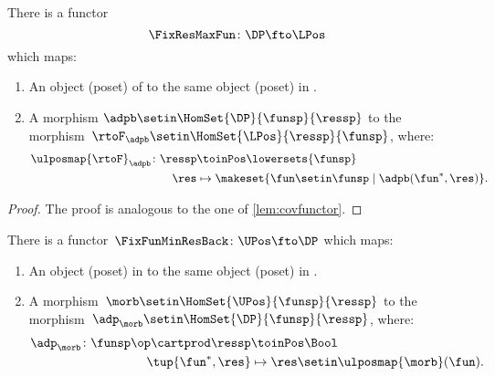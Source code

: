 \begin{lemma}
    \label{lem:confunctor}
    There is a functor
    \begin{equation}
        \FixResMaxFun\colon \DP \fto \LPos
    \end{equation}
    which maps:
    \begin{enumerate}
        \item An object (poset) of \DP to the same object (poset) in \LPos.
        \item A morphism $\adpb \setin \HomSet{\DP}{\funsp}{\ressp}$ to the morphism~$\rtoF_\adpb\setin \HomSet{\LPos}{\ressp}{\funsp}$, where:
              \begin{equation*}
                  \begin{aligned}
                      \ulposmap{\rtoF}_\adpb\colon \ressp & \toinPos \lowersets{\funsp} \\
                      \res                                & \mapsto \makeset{ \fun \setin \funsp \mid \adpb(\fun^*,\res)}.
                  \end{aligned}
              \end{equation*}
    \end{enumerate}
\end{lemma}

\begin{proof}
    The proof is analogous to the one of \cref{lem:covfunctor}.
\end{proof}

\begin{lemma}
    \label{lem:covfunctorback}
    There is a functor~$\FixFunMinResBack\colon \UPos \fto \DP$ which maps:
    \begin{enumerate}
        \item An object (poset) in \UPos to the same object (poset) in \DP.
        \item A morphism~$\morb\setin \HomSet{\UPos}{\funsp}{\ressp}$ to the morphism~$\adp_\morb \setin \HomSet{\DP}{\funsp}{\ressp}$, where:
              \begin{equation}
                  \begin{aligned}
                      \adp_\morb\colon \funsp\op \cartprod \ressp & \toinPos \Bool \\
                      \tup{\fun^*,\res}                           & \mapsto \res \setin \ulposmap{\morb}(\fun).
                  \end{aligned}
              \end{equation}
    \end{enumerate}
\end{lemma}

